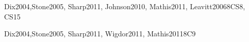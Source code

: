 \begin{syllabus}
\begin{unit}{\HCIDesigningInteraction}{}{Dix2004,Stone2005, Sharp2011, Johnson2010, Mathis2011, Leavitt2006}{8}{CS8, CS15}
\begin{topics}%
    \item \HCIDesigningInteractionTopicPrinciplesOf
    \item \HCIDesigningInteractionTopicElements
    \item \HCIDesigningInteractionTopicHandling
    \item \HCIDesigningInteractionTopicUser
    \item \HCIProgrammingInteractiveSystemsTopicPresenting
    \item \HCIProgrammingInteractiveSystemsTopicInterface
    \item \HCIProgrammingInteractiveSystemsTopicWidget
    \item \HCIUsercentereddesignandtestingTopicInternationalization
    \item \HCIProgrammingInteractiveSystemsTopicChoosing
\end{topics}
\begin{learningoutcomes}
    \item \HCIDesigningInteractionLOCreateATogether [\Usage]
\end{learningoutcomes}
\end{unit}

\begin{unit}{\HCINewInteractiveTechnologies}{}{Dix2004,Stone2005, Sharp2011, Wigdor2011, Mathis2011}{8}{C9}
\begin{topics}%
	\item \HCINewInteractiveTechnologiesTopicChoosing
	\item \HCINewInteractiveTechnologiesTopicApproachesTo
	\item \HCIMixedAugmentedandVirtualRealityTopicOutput
	\item \HCIMixedAugmentedandVirtualRealityTopicSystem
\end{topics}
\begin{learningoutcomes}
	\item \HCINewInteractiveTechnologiesLODescribeWhen [\Familiarity]
	\item \HCINewInteractiveTechnologiesLOUnderstandThe [\Familiarity]
	\item \HCINewInteractiveTechnologiesLODiscussTheDisadvantages [\Usage]
	\item \HCIMixedAugmentedandVirtualRealityLODescribeTheRealized [\Familiarity]
	\item \HCIMixedAugmentedandVirtualRealityLODescribeTheDifferentTechnologies [\Familiarity]
	\item \HCIMixedAugmentedandVirtualRealityLODetermineThe [\Assessment]
\end{learningoutcomes}
\end{unit}


\end{syllabus}
